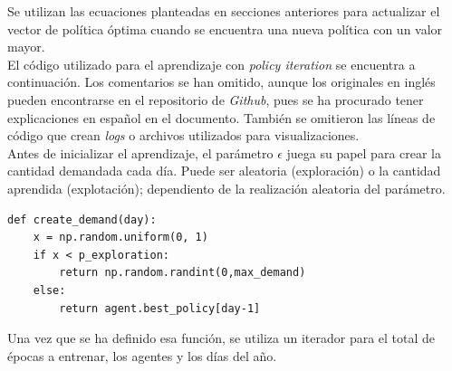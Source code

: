 Se utilizan las ecuaciones planteadas en secciones anteriores para actualizar el vector de pol\'itica \'optima cuando se encuentra una nueva pol\'itica con un valor mayor.\\

El código utilizado para el aprendizaje con \textit{policy iteration} se encuentra a continuaci\'on. Los comentarios se han omitido, aunque los originales en ingl\'es pueden encontrarse en el repositorio de \textit{Github}, pues se ha procurado tener explicaciones en espa\~nol en el documento. Tambi\'en se omitieron las l\'ineas de c\'odigo que crean \textit{logs} o archivos utilizados para visualizaciones.\\

Antes de inicializar el aprendizaje, el par\'ametro $\epsilon$ juega su papel para crear la cantidad demandada cada d\'ia. Puede ser aleatoria (exploraci\'on) o la cantidad aprendida (explotaci\'on); dependiento de la realizaci\'on aleatoria del par\'ametro.

\begin{verbatim}
def create_demand(day):
    x = np.random.uniform(0, 1)
    if x < p_exploration:  
        return np.random.randint(0,max_demand) 
    else: 
        return agent.best_policy[day-1]
\end{verbatim}

Una vez que se ha definido esa funci\'on, se utiliza un iterador para el total de \'epocas a entrenar, los agentes y los d\'ias del a\~no.

